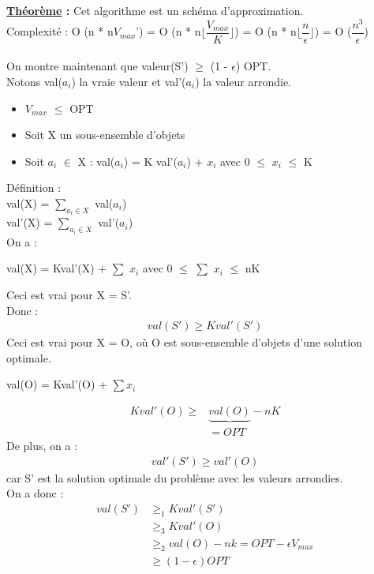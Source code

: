 \documentclass[12pt,a4paper]{article}
\newcommand\tab[1][0.65cm]{\hspace*{#1}}
\begin{document}
\textbf{\underline{Théorème} :} Cet algorithme est un schéma d'approximation.\\
{\color{red} Complexité : O (n * n$V_{max}$') = O (n * n$\lfloor \dfrac{V_{max}}{K} \rfloor$) = O (n * n$\lfloor \dfrac{n}{\epsilon} \rfloor$) = O ($\dfrac{n^3}{\epsilon}$)}\\\\
On montre maintenant que valeur(S') $\geq$ (1 - $\epsilon$) OPT.\\
Notons val($a_i$) la vraie valeur et val'($a_i$) la valeur arrondie.
\begin{itemize}
	\item $V_{max}$ $\leq$ OPT
	\item Soit X un sous-ensemble d'objets
	\item Soit $a_i$ $\in$ X : val($a_i$) = K val'($a_i$) + $x_i$ avec 0 $\leq$ $x_i$ $\leq$ K
\end{itemize}
Définition :\\
\tab val(X) = $\displaystyle \sum_{a_i \in X}$ val($a_i$)\\
\tab val'(X) = $\displaystyle \sum_{a_i \in X}$ val'($a_i$)\\
On a :
\begin{center}
	{\color{blue} val(X) = Kval'(X) + $\sum$ $x_i$ avec 0 $\leq$ $\sum$ $x_i$ $\leq$ nK}
\end{center}
Ceci est vrai pour X = S'.\\
Donc :\\
{\color{blue}
	\begin{equation}
		\begin{split}
			val(S') \geq Kval'(S')
		\end{split}
	\end{equation}}
Ceci est vrai pour X = O, où O est sous-ensemble d'objets d'une solution optimale.
\begin{center}
	val(O) = Kval'(O) + $\sum$$x_i$
\end{center}
{\color{blue}
	\begin{equation}
		\begin{split}
			Kval'(O) \geq & \underbrace{val(O)} - nK\\
						  & = OPT
		\end{split}
	\end{equation}}
De plus, on a :
{\color{blue}
	\begin{equation}
		\begin{split}
			val'(S') \geq val'(O)
		\end{split}
	\end{equation}}
car S' est la solution optimale du problème avec les valeurs arrondies.\\
On a donc :
{\color{red}
	\begin{align*}
		val(S') &\geq_1 Kval'(S')\\
				&\geq_3 Kval'(O)\\
				&\geq_2 val(O) - nk = OPT - \epsilon V_{max}\\
				&\geq (1 - \epsilon) OPT
	\end{align*}}
\newpage
\end{document}
